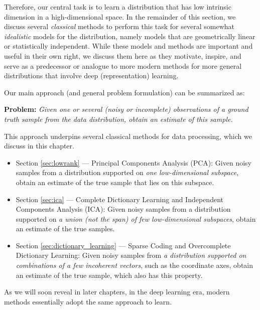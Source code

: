 \documentclass[../../book-main.tex]{subfiles}
\begin{document}
Therefore, our central task is to learn a distribution that has low intrinsic dimension in a high-dimensional space. In the remainder of this section, we discuss several \textit{classical} methods to perform this task for several somewhat {\em idealistic} models for the distribution, namely models that are geometrically linear or statistically independent. While these models and methods are important and useful in their own right, we discuss them here as they motivate, inspire, and serve as a predecessor or analogue to more modern methods for more general distributions that involve deep (representation) learning.

Our main approach (and general problem formulation) can be summarized as:
\begin{tcolorbox}\centering
    \textbf{Problem:} \textit{Given one or several (noisy or incomplete) observations of a ground truth sample from the data distribution, obtain an estimate of this sample.}
\end{tcolorbox}
This approach underpins several classical methods for data processing, which we discuss in this chapter.
\begin{itemize}
    \item Section \ref{sec:lowrank} --- Principal Components Analysis (PCA): Given noisy samples from a distribution supported on {\em one low-dimensional subspace}, obtain an estimate of the true sample that lies on this subspace.
    \item  Section \ref{sec:ica} --- Complete Dictionary Learning and Independent Components Analysis (ICA): Given noisy samples from a distribution supported on {\em a union (\textit{not} the span) of few low-dimensional subspaces}, obtain an estimate of the true samples.
    \item Section \ref{sec:dictionary_learning} --- Sparse Coding and Overcomplete Dictionary Learning: Given noisy samples from {\em a distribution supported on combinations of a few incoherent vectors}, such as the coordinate axes, obtain an estimate of the true sample, which also has this property.
\end{itemize}
As we will soon reveal in later chapters, in the deep learning era, modern methods essentially adopt the same approach to learn.
\end{document}
